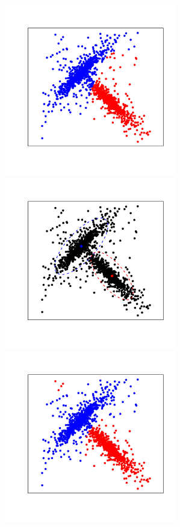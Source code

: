 \documentclass[landscape,footrule]{foils}
\begin{document}
\begin{center}
\includegraphics[width=7.5cm]{hard-gmm-4}\hspace*{-1cm}
\includegraphics[width=7.5cm]{hard-gmm-5}\hspace*{-1cm}
\includegraphics[width=7.5cm]{hard-gmm-6}
\vspace*{-1cm}
\end{center}
\end{document}
